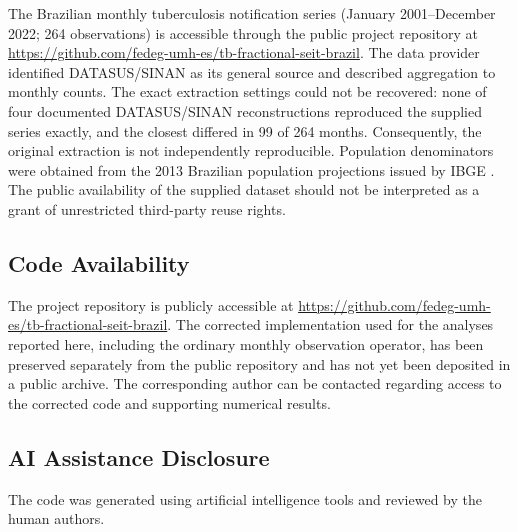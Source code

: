 \documentclass[pdflatex,sn-mathphys-ay]{sn-jnl}
\begin{document}
The Brazilian monthly tuberculosis notification series (January 2001--December 2022; 264 observations) is accessible through the public project repository at \url{https://github.com/fedeg-umh-es/tb-fractional-seit-brazil}. The data provider identified DATASUS/SINAN as its general source and described aggregation to monthly counts. The exact extraction settings could not be recovered: none of four documented DATASUS/SINAN reconstructions reproduced the supplied series exactly, and the closest differed in 99 of 264 months. Consequently, the original extraction is not independently reproducible. Population denominators were obtained from the 2013 Brazilian population projections issued by IBGE \citep{ibge2013}. The public availability of the supplied dataset should not be interpreted as a grant of unrestricted third-party reuse rights.

\subsection{Code Availability}

The project repository is publicly accessible at \url{https://github.com/fedeg-umh-es/tb-fractional-seit-brazil}. The corrected implementation used for the analyses reported here, including the ordinary monthly observation operator, has been preserved separately from the public repository and has not yet been deposited in a public archive. The corresponding author can be contacted regarding access to the corrected code and supporting numerical results.

\subsection{AI Assistance Disclosure}

The code was generated using artificial intelligence tools and reviewed by the human authors.


\end{document}

